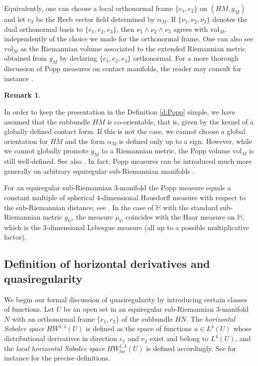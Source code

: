 \documentclass[10pt,letterpaper]{amsart}
\theoremstyle{definition}
\newtheorem{remark}[thm]{Remark}
\numberwithin{thm}{subsection}
\numberwithin{equation}{section}
\begin{document}
Equivalently, one can choose a local orthonormal frame $\{e_1,e_2\}$
on $(HM ,g_M)$ and let $e_3$ be the Reeb vector field determined by $\alpha_M$.  If  $\{\nu_1,\nu_2,\nu_3\}$ denotes the dual orthonormal basis to  $\{e_1,e_2,e_3\}$, then $\nu_1\wedge \nu_2 \wedge\nu_3$ agrees with  $\mathrm{vol}_M$, independently of the choice we made for the orthonormal frame.
One can also see $\mathrm{vol}_M$ as the Riemannian volume associated to the extended Riemannian metric obtained from $g_M$ by declaring $\{e_1,e_2,e_3\}$ orthonormal. For a more thorough discussion of Popp measures on contact manifolds, the reader may consult for instance  \cite{MR3263162,MR3207127}.

 

\begin{remark}\label{r:popp_global_orientable}

In order to keep the presentation in the Definition \ref{d:Popp} simple, we have assumed that the subbundle $HM$ is co-orientable, that is, given by the kernel of a globally defined contact form. If this is not the case, we cannot choose a global orientation for $HM$ and the form $\alpha_M$ is defined only up to a sign. However, while we cannot globally promote $g_M$ to a Riemannian metric, the Popp volume $\mathrm{vol}_M$ is still well-defined. See also \cite[Remark 9]{MR2502528}. In fact, Popp measures can be introduced much more generally on arbitrary equiregular sub-Riemannian manifolds \cite[10.6]{MR1867362}.
\end{remark}

For an equiregular sub-Riemannian $3$-manifold
the Popp measure equals a constant multiple of spherical
$4$-dimensional Hausdorff measure with respect to the sub-Riemannian distance; see \cite[Theorem 4]{MR2875644}.
In the case
of ${\mathbb H}$ with the standard sub-Riemannian metric
$g_{\mathbb H}$, the measure $\mu_{\mathbb H}$ coincides  with the Haar measure on
${\mathbb H}$, which is the $3$-dimensional Lebesgue measure (all up
to a possible multiplicative factor).

\subsection{Definition of horizontal derivatives and quasiregularity}\label{ss:defQR}
We begin our formal discussion of quasiregularity by introducing
certain classes of functions. Let $U$ be an open set in an
equiregular sub-Riemannian $3$-manifold $N$ with an orthonormal
frame $\{e_1,e_2\}$ of the subbundle $HN$. The \emph{horizontal
Sobolev space} $HW^{1,4}(U)$ is defined as the space of functions
$u\in L^4(U)$ whose distributional derivatives in direction $e_1$
and $e_2$ exist and belong to $L^4(U)$, and the \emph{local
horizontal Sobolev space} $HW_{loc}^{1,4}(U)$ is defined
accordingly. See for instance \cite[Section 2.2]{CLDO} for the
precise definitions.
\end{document}
